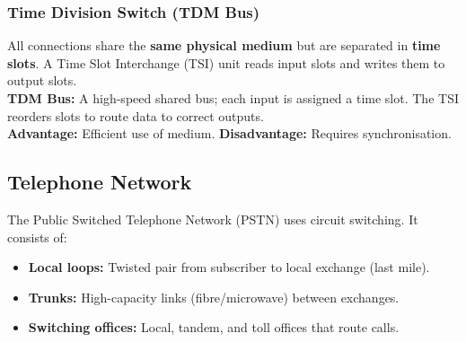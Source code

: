 \documentclass[12pt,a4paper]{article}
\begin{document}
\subsubsection*{Time Division Switch (TDM Bus)}

\begin{tcolorbox}[formulabox, title={\textbf{Time Division Switching}}]
All connections share the \textbf{same physical medium} but are separated in \textbf{time slots}. A Time Slot Interchange (TSI) unit reads input slots and writes them to output slots.\\[4pt]
\textbf{TDM Bus:} A high-speed shared bus; each input is assigned a time slot. The TSI reorders slots to route data to correct outputs.\\
\textbf{Advantage:} Efficient use of medium. \textbf{Disadvantage:} Requires synchronisation.
\end{tcolorbox}

\subsection{Telephone Network}

The Public Switched Telephone Network (PSTN) uses circuit switching. It consists of:
\begin{itemize}[leftmargin=*, itemsep=3pt]
  \item \textbf{Local loops:} Twisted pair from subscriber to local exchange (last mile).
  \item \textbf{Trunks:} High-capacity links (fibre/microwave) between exchanges.
  \item \textbf{Switching offices:} Local, tandem, and toll offices that route calls.
\end{itemize}

\begin{tcolorbox}[tikzbox, title={Telephone Network Structure}]
\centering
{}
\end{tcolorbox}
\end{document}
